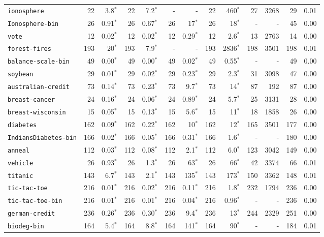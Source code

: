 \begin{tabular}{lrrrrrrrrrrrr}
\texttt{ionosphere} & 22 & 3.8$^*$ & 22 & 7.2$^*$ & - & - & 22 & 460$^*$ & 27 & 3268 & 29 & 0.01\\
\texttt{Ionosphere-bin} & 26 & 0.91$^*$ & 26 & 0.67$^*$ & 26 & 17$^*$ & 26 & 18$^*$ & - & - & 45 & 0.00\\
\texttt{vote} & 12 & 0.02$^*$ & 12 & 0.02$^*$ & 12 & 0.29$^*$ & 12 & 2.6$^*$ & 13 & 2763 & 14 & 0.00\\
\texttt{forest-fires} & 193 & 20$^*$ & 193 & 7.9$^*$ & - & - & 193 & 2836$^*$ & 198 & 3501 & 198 & 0.01\\
\texttt{balance-scale-bin} & 49 & 0.00$^*$ & 49 & 0.00$^*$ & 49 & 0.02$^*$ & 49 & 0.55$^*$ & - & - & 49 & 0.00\\
\texttt{soybean} & 29 & 0.01$^*$ & 29 & 0.02$^*$ & 29 & 0.23$^*$ & 29 & 2.3$^*$ & 31 & 3098 & 47 & 0.00\\
\texttt{australian-credit} & 73 & 0.14$^*$ & 73 & 0.23$^*$ & 73 & 9.7$^*$ & 73 & 14$^*$ & 87 & 192 & 87 & 0.00\\
\texttt{breast-cancer} & 24 & 0.16$^*$ & 24 & 0.06$^*$ & 24 & 0.89$^*$ & 24 & 5.7$^*$ & 25 & 3131 & 28 & 0.00\\
\texttt{breast-wisconsin} & 15 & 0.05$^*$ & 15 & 0.13$^*$ & 15 & 5.6$^*$ & 15 & 11$^*$ & 18 & 1858 & 26 & 0.00\\
\texttt{diabetes} & 162 & 0.09$^*$ & 162 & 0.22$^*$ & 162 & 10$^*$ & 162 & 12$^*$ & 165 & 3501 & 177 & 0.00\\
\texttt{IndiansDiabetes-bin} & 166 & 0.02$^*$ & 166 & 0.05$^*$ & 166 & 0.31$^*$ & 166 & 1.6$^*$ & - & - & 180 & 0.00\\
\texttt{anneal} & 112 & 0.03$^*$ & 112 & 0.08$^*$ & 112 & 2.1$^*$ & 112 & 6.0$^*$ & 123 & 3042 & 149 & 0.00\\
\texttt{vehicle} & 26 & 0.93$^*$ & 26 & 1.3$^*$ & 26 & 63$^*$ & 26 & 66$^*$ & 42 & 3374 & 66 & 0.01\\
\texttt{titanic} & 143 & 6.7$^*$ & 143 & 2.1$^*$ & 143 & 135$^*$ & 143 & 173$^*$ & 150 & 3362 & 148 & 0.01\\
\texttt{tic-tac-toe} & 216 & 0.01$^*$ & 216 & 0.02$^*$ & 216 & 0.11$^*$ & 216 & 1.8$^*$ & 232 & 1794 & 236 & 0.00\\
\texttt{tic-tac-toe-bin} & 216 & 0.01$^*$ & 216 & 0.01$^*$ & 216 & 0.04$^*$ & 216 & 0.96$^*$ & - & - & 236 & 0.00\\
\texttt{german-credit} & 236 & 0.26$^*$ & 236 & 0.30$^*$ & 236 & 9.4$^*$ & 236 & 13$^*$ & 244 & 2329 & 251 & 0.00\\
\texttt{biodeg-bin} & 164 & 5.4$^*$ & 164 & 8.8$^*$ & 164 & 141$^*$ & 164 & 90$^*$ & - & - & 184 & 0.01\\

\end{tabular}
